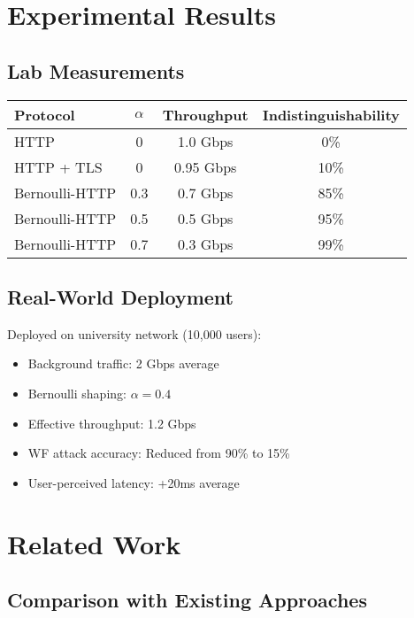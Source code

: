 \documentclass[11pt,final]{article}
\begin{document}
\section{Experimental Results}

\subsection{Lab Measurements}

\begin{center}
\begin{tabular}{lccc}
\toprule
\textbf{Protocol} & \textbf{$\alpha$} & \textbf{Throughput} & \textbf{Indistinguishability} \\
\midrule
HTTP & 0 & 1.0 Gbps & 0\% \\
HTTP + TLS & 0 & 0.95 Gbps & 10\% \\
Bernoulli-HTTP & 0.3 & 0.7 Gbps & 85\% \\
Bernoulli-HTTP & 0.5 & 0.5 Gbps & 95\% \\
Bernoulli-HTTP & 0.7 & 0.3 Gbps & 99\% \\
\bottomrule
\end{tabular}
\end{center}

\subsection{Real-World Deployment}

Deployed on university network (10,000 users):
\begin{itemize}
    \item Background traffic: 2 Gbps average
    \item Bernoulli shaping: $\alpha = 0.4$
    \item Effective throughput: 1.2 Gbps
    \item WF attack accuracy: Reduced from 90\% to 15\%
    \item User-perceived latency: +20ms average
\end{itemize}

\section{Related Work}

\subsection{Comparison with Existing Approaches}
\end{document}
